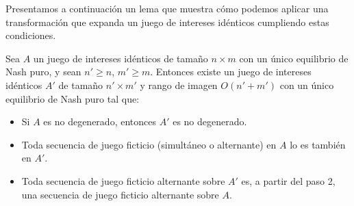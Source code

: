 Presentamos a continuación un lema que muestra cómo podemos aplicar una transformación que expanda un juego de intereses idénticos cumpliendo estas condiciones.

\begin{lemma}\label{lema:preservacion}
    Sea $A$ un juego de intereses idénticos de tamaño $n\times m$ con un único equilibrio de Nash puro, y sean $n'\geq n$, $m'\geq m$. Entonces existe un juego de intereses idénticos $A'$ de tamaño $n'\times m'$ y rango de imagen $O(n'+m')$ con un único equilibrio de Nash puro tal que:
    \begin{itemize}
        \item Si $A$ es no degenerado, entonces $A'$ es no degenerado.
        \item Toda secuencia de juego ficticio (simultáneo o alternante) en $A$ lo es también en $A'$.
        \item Toda secuencia de juego ficticio alternante sobre $A'$ es, a partir del paso 2, una secuencia de juego ficticio alternante sobre $A$.
    \end{itemize}
    
\end{lemma}
